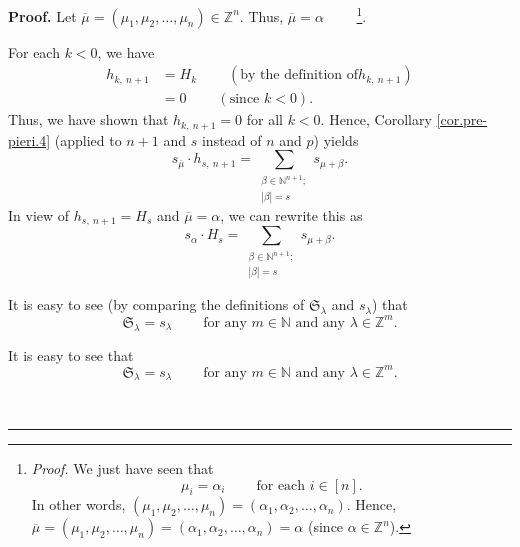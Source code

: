 \documentclass[numbers=enddot,12pt,final,onecolumn,notitlepage,english]{scrartcl}%
\theoremstyle{definition}
\newenvironment{proof}[1][Proof]{\noindent\textbf{#1.} }{\ \rule{0.5em}{0.5em}}
\let\sumnonlimits\sum
\renewcommand{\sum}{\sumnonlimits\limits}
\newenvironment{verlong}{}{}
\newenvironment{vershort}{}{}
\begin{document}
\begin{proof}
\begin{verlong}
Let $\overline{\mu}=\left(  \mu_{1},\mu_{2},\ldots,\mu_{n}\right)
\in\mathbb{Z}^{n}$. Thus, $\overline{\mu}=\alpha$%
\ \ \ \ \footnote{\textit{Proof.} We just have seen that%
\[
\mu_{i}=\alpha_{i}\ \ \ \ \ \ \ \ \ \ \text{for each }i\in\left[  n\right]  .
\]
In other words, $\left(  \mu_{1},\mu_{2},\ldots,\mu_{n}\right)  =\left(
\alpha_{1},\alpha_{2},\ldots,\alpha_{n}\right)  $. Hence, $\overline{\mu
}=\left(  \mu_{1},\mu_{2},\ldots,\mu_{n}\right)  =\left(  \alpha_{1}%
,\alpha_{2},\ldots,\alpha_{n}\right)  =\alpha$ (since $\alpha\in\mathbb{Z}%
^{n}$).}.
\end{verlong}

For each $k<0$, we have
\begin{align*}
h_{k,\ n+1}  &  =H_{k}\ \ \ \ \ \ \ \ \ \ \left(  \text{by the definition of
}h_{k,\ n+1}\right) \\
&  =0\ \ \ \ \ \ \ \ \ \ \left(  \text{since }k<0\right)  .
\end{align*}
Thus, we have shown that $h_{k,\ n+1}=0$ for all $k<0$. Hence, Corollary
\ref{cor.pre-pieri.4} (applied to $n+1$ and $s$ instead of $n$ and $p$) yields%
\[
s_{\overline{\mu}}\cdot h_{s,\ n+1}=\sum_{\substack{\beta\in\mathbb{N}%
^{n+1};\\\left\vert \beta\right\vert =s}}s_{\mu+\beta}.
\]
In view of $h_{s,\ n+1}=H_{s}$ and $\overline{\mu}=\alpha$, we can rewrite
this as%
\begin{equation}
s_{\alpha}\cdot H_{s}=\sum_{\substack{\beta\in\mathbb{N}^{n+1};\\\left\vert
\beta\right\vert =s}}s_{\mu+\beta}. \label{pf.prop.immac.1}%
\end{equation}


\begin{vershort}
It is easy to see (by comparing the definitions of $\mathfrak{S}_{\lambda}$
and $s_{\lambda}$) that%
\begin{equation}
\mathfrak{S}_{\lambda}=s_{\lambda}\ \ \ \ \ \ \ \ \ \ \text{for any }%
m\in\mathbb{N}\text{ and any }\lambda\in\mathbb{Z}^{m}.
\label{pf.prop.immac.short.S=s}%
\end{equation}

\end{vershort}

\begin{verlong}
It is easy to see that%
\begin{equation}
\mathfrak{S}_{\lambda}=s_{\lambda}\ \ \ \ \ \ \ \ \ \ \text{for any }%
m\in\mathbb{N}\text{ and any }\lambda\in\mathbb{Z}^{m}.
\label{pf.prop.immac.S=s}%
\end{equation}



\end{verlong}
\end{proof}
\end{document}
